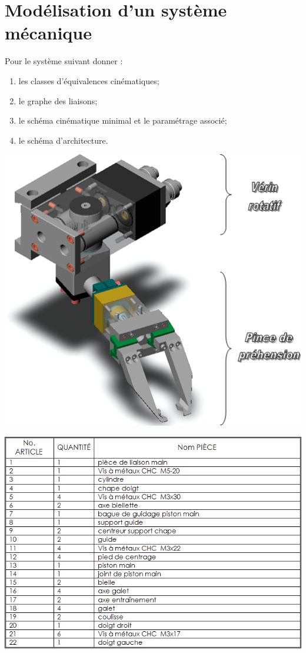\documentclass[11pt,oneside]{article}
\begin{document}
\section{Modélisation d'un système mécanique}
\begin{minipage}[c]{.55\linewidth}
Pour le système suivant donner :
\begin{enumerate}
\item les classes d'équivalences cinématiques;
\item le graphe des liaisons;
\item le schéma cinématique minimal et le paramétrage associé;
\item le schéma d'architecture.
\end{enumerate}
\end{minipage}\hfill
\begin{minipage}[c]{.4\linewidth}
\includegraphics[width=.95\textwidth]{png/fig1}
\end{minipage}\hfill

\vspace{.5cm}

\begin{center}
\includegraphics[width=.55\textwidth]{png/fig2}
\end{center}
\end{document}

